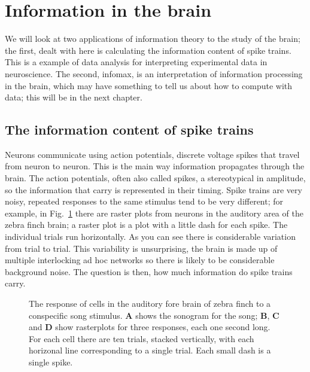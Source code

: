 \documentclass[12pt]{article}
\begin{document}
\section*{Information in the brain} 

We will look at two applications of information theory to the study of
the brain; the first, dealt with here is calculating the information
content of spike trains. This is a example of data analysis for
interpreting experimental data in neuroscience. The second, infomax,
is an interpretation of information processing in the brain, which may
have something to tell us about how to compute with data; this will be in the next chapter.

\subsection*{The information content of spike trains}

Neurons communicate using action potentials, discrete voltage spikes
that travel from neuron to neuron. This is the main way information
propagates through the brain. The action potentials, often also called
spikes, a stereotypical in amplitude, so the information that carry is
represented in their timing. Spike trains are very noisy, repeated
responses to the same stimulus tend to be very different; for example,
in Fig.~\ref{fig_zebra_finch} there are raster plots from neurons in
the auditory area of the zebra finch brain; a raster plot is a plot
with a little dash for each spike. The individual trials run
horizontally. As you can see there is considerable variation from
trial to trial. This variability is unsurprising, the brain is made up
of multiple interlocking ad hoc networks so there is likely to be
considerable background noise. The question is then, how much
information do spike trains carry.

\begin{figure}[htb]
\begin{center}

\end{center}
\caption{The response of cells in the auditory fore brain of zebra
  finch to a conspecific song stimulus. \textbf{A} shows the sonogram
  for the song; \textbf{B}, \textbf{C} and \textbf{D} show rasterplots
  for three responses, each one second long. For each cell there are
  ten trials, stacked vertically, with each horizonal line
  corresponding to a single trial. Each small dash is a single
  spike.\label{fig_zebra_finch}}
\end{figure}
\end{document}
